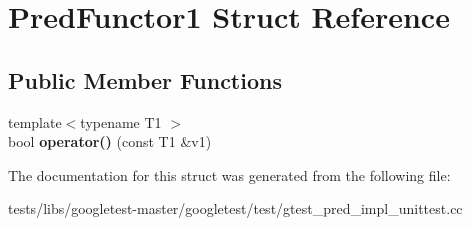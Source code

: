 \hypertarget{structPredFunctor1}{}\section{Pred\+Functor1 Struct Reference}
\label{structPredFunctor1}
\subsection*{Public Member Functions}
\begin{DoxyCompactItemize}
\item 
\mbox{\label{structPredFunctor1_a78d81d1bac0ee7f81ea631c49bfab3e2}} 
{\footnotesize template$<$typename T1 $>$ }\\bool {\bfseries operator()} (const T1 \&v1)
\end{DoxyCompactItemize}


The documentation for this struct was generated from the following file\+:\begin{DoxyCompactItemize}
\item 
tests/libs/googletest-\/master/googletest/test/gtest\+\_\+pred\+\_\+impl\+\_\+unittest.\+cc\end{DoxyCompactItemize}
